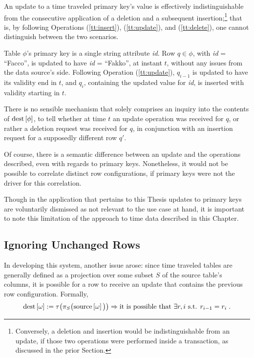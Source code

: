 An update to a time traveled primary key's value is effectively indistinguishable from the consecutive application of a deletion and a subsequent insertion;\footnote{%
	Conversely, a deletion and insertion would be indistinguishable from an update, if those two operations were performed inside a transaction, as discussed in the prior Section.
} that is, by following Operations (\ref{tt:insert}), (\ref{tt:update}), and (\ref{tt:delete}), one cannot distinguish between the two scenarios.

\begin{example}
	Table $\phi$'s primary key is a single string attribute \emph{id}.
	Row $q \in \phi$, with \emph{id} = ``Facco'', is updated to have \emph{id} = ``Fakko'', at instant $t$, without any issues from the data source's side.
	Following Operation (\ref{tt:update}), $q_{i-1}$ is updated to have its validity end in $t$, and $q_i$, containing the updated value for \emph{id}, is inserted with validity starting in $t$.
	
	There is no sensible mechanism that solely comprises an inquiry into the contents of $\text{dest}\left[{\phi}\right]$, to tell whether at time $t$ an update operation was received for $q$, or rather a deletion request was received for $q$, in conjunction with an insertion request for a supposedly different row $q'$.
\end{example}

Of course, there is a semantic difference between an update and the operations described, even with regards to primary keys.
Nonetheless, it would not be possible to correlate distinct row configurations, if primary keys were not the driver for this correlation.

Though in the application that pertains to this Thesis updates to primary keys are voluntarily dismissed as not relevant to the use case at hand, it is important to note this limitation of the approach to time data described in this Chapter.


\subsection{Ignoring Unchanged Rows}
\label{sec:tt-unchaged-rows}

In developing this system, another issue arose: since time traveled tables are generally defined as a projection over some subset $S$ of the source table's columns, it is possible for a row to receive an update that contains the previous row configuration.
Formally,
$$
\text{dest}\left[{\omega}\right] := \tau\big(\pi_{S}\big(\text{source}\left[{\omega}\right]\big)\big) \Rightarrow
\text{it is possible that } \exists r, i \text{ s.t. } r_{i-1} = r_i \; .
$$


